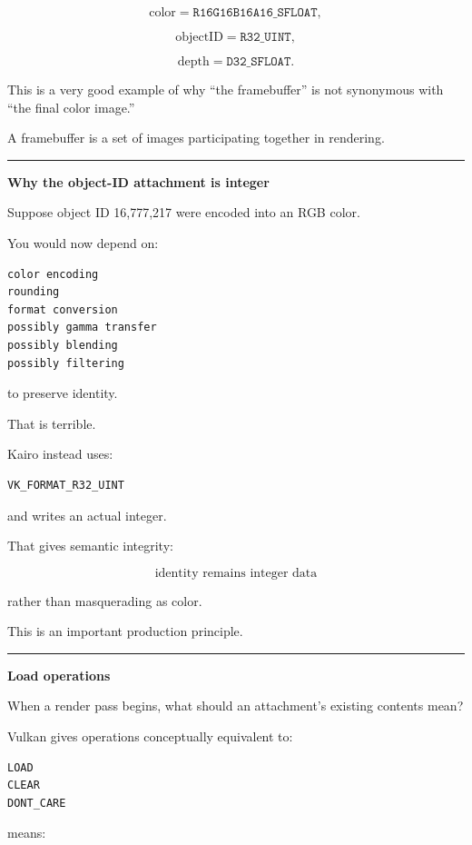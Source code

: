\[
\text{color} = \texttt{R16G16B16A16\_SFLOAT},
\]

\[
\text{objectID} = \texttt{R32\_UINT},
\]

\[
\text{depth} = \texttt{D32\_SFLOAT}.
\]

This is a very good example of why ``the framebuffer'' is not synonymous with ``the final color image.''

A framebuffer is a set of images participating together in rendering.

\begin{center}\rule{0.5\linewidth}{0.5pt}\end{center}

\textbf{Why the object-ID attachment is integer}

Suppose object ID 16,777,217 were encoded into an RGB color.

You would now depend on:

\begin{verbatim}
color encoding
rounding
format conversion
possibly gamma transfer
possibly blending
possibly filtering
\end{verbatim}

to preserve identity.

That is terrible.

Kairo instead uses:

\begin{verbatim}
VK_FORMAT_R32_UINT
\end{verbatim}

and writes an actual integer.

That gives semantic integrity:

\[
\boxed{\text{identity remains integer data}}
\]

rather than masquerading as color.

This is an important production principle.

\begin{center}\rule{0.5\linewidth}{0.5pt}\end{center}

\textbf{Load operations}

When a render pass begins, what should an attachment's existing contents mean?

Vulkan gives operations conceptually equivalent to:

\begin{verbatim}
LOAD
CLEAR
DONT_CARE
\end{verbatim}

 means:

